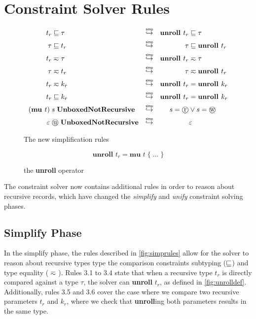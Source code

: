 \section{Constraint Solver Rules}

\begin{figure}
    \centering
    \begin{align}
       t_r  &\subtype \tau  & \simp  && \textbf{unroll } t_r  &\subtype  \tau \\
       \tau &\subtype t_r   & \simp  && \tau                  &\subtype  \textbf{unroll } t_r \\
       t_r  &\typeeq  \tau  & \simp  && \textbf{unroll } t_r  &\typeeq   \tau \\
       \tau &\typeeq  t_r   & \simp  && \tau                  &\typeeq   \textbf{unroll } t_r \\
       t_r  &\typeeq  k_r   & \simp  && \textbf{unroll } t_r  &=         \textbf{unroll } k_r \\
       t_r  &\subtype k_r   & \simp  && \textbf{unroll } t_r  &=         \textbf{unroll } k_r \\
       (\textbf{mu } t)\; &s\; \textbf{UnboxedNotRecursive}   
            & \simp &&  s = \text{\textcircled{r}} &\lor s = \text{\textcircled{w}} \\
       \varepsilon\; &\text{\textcircled{u}}\; \textbf{UnboxedNotRecursive}   
            & \simp &&  &\varepsilon
    \end{align}
    \caption{The new simplification rules}
    \label{fig:simprules}
\end{figure}

\begin{figure}
    \centering
    \[
        \textbf{unroll } t_r = \textbf{mu } t\; \{\; \dots\; \} 
    \]
    \caption{the \textbf{unroll} operator}
    \label{fig:unrolldef}
\end{figure}

The constraint solver now contains additional rules in order to reason about recursive
records, which have changed the \textit{simplify} and \textit{unify}
constraint solving phases.

\subsection{Simplify Phase}

In the simplify phase, the rules described in \autoref{fig:simprules} allow for
the solver to reason about recursive types type the comparison constraints
subtyping ($\sqsubseteq$) and type equality ($\typeeq$). Rules 3.1 to 3.4 state that
when a recursive type $t_r$ is directly compared against a type $\tau$, the solver
can \textbf{unroll} $t_r$, as defined in \autoref{fig:unrolldef}.
Additionally, rules 3.5 and 3.6 cover the case where we compare two recursive parameters
$t_r$ and $k_r$, where we check that \textbf{unroll}ing both parameters results
in the same type.

